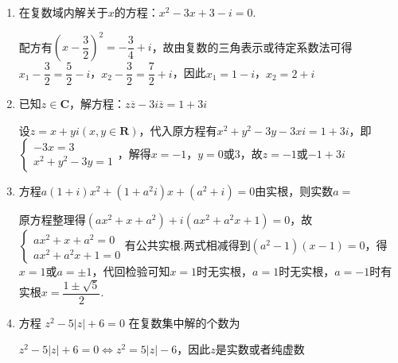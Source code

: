 \begin{enumerate}
\begin{enumerate}
    \item 在复数域内解关于$x$的方程：$x^2-3x+3-i = 0$.
    \begin{jieda}
        配方有$\left(x-\dfrac{3}{2}\right)^2 = -\dfrac{3}{4} + i$，故由复数的三角表示或待定系数法可得$x_1-\dfrac{3}{2} = \dfrac{5}{2} - i$，$x_2 - \dfrac{3}{2} = \dfrac{7}{2}+i$，因此$x_1  = 1 - i$，$x_2  = 2+i$
    \end{jieda}
    \item 已知$z \in \mathbf{C}$，解方程：$z\overline{z} - 3i\overline{z} = 1+3i$
    \begin{jieda}
        设$z = x + y i(x, y \in \mathbf{R})$，代入原方程有$x^2+y^2-3y-3xi = 1+3i$，即$\left \{\begin{array}{l}
             -3x = 3  \\
             x^2+y^2 - 3y = 1 
        \end{array} \right.$，解得$x = -1$，$y = 0$或$3$，故$z = -1$或$-1+3i$
    \end{jieda}
    \item 方程$a(1+i)x^2 + (1+a^2i)x + (a^2+i) = 0$由实根，则实数$a = $
    \begin{jieda}
        原方程整理得$(ax^2+x+a^2) + i(ax^2+a^2x+1) = 0$，故$\left \{ \begin{array}{l}
             ax^2+x+a^2 = 0  \\
             ax^2+a^2x+1 = 0
        \end{array}\right .$有公共实根.两式相减得到$(a^2-1)(x-1) = 0$，得$x = 1$或$a = \pm 1$，代回检验可知$x = 1$时无实根，$a = 1$时无实根，$a = -1$时有实根$x = \dfrac{1\pm \sqrt{5}}{2}$.
    \end{jieda}
    
    \item 方程 $ {z}^{2} - 5\left| z\right|  + 6 = 0 $ 在复数集中解的个数为
    \begin{jieda}
        ${z}^{2} - 5\left| z\right|  + 6 = 0 \Longleftrightarrow z^2 = 5|z| - 6$，因此$z$是实数或者纯虚数
    \end{jieda}
\end{enumerate}
\end{enumerate}
